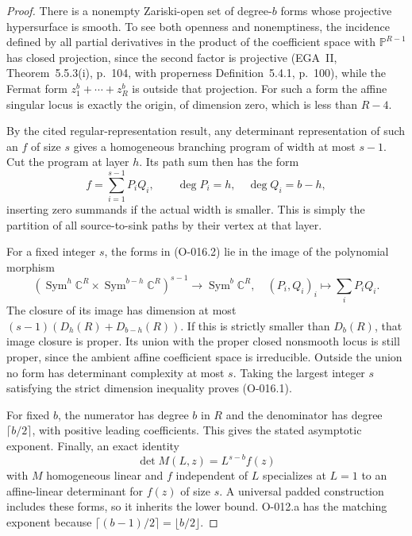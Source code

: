 \begin{proof}
There is a nonempty Zariski-open set of degree-$b$ forms
whose projective hypersurface is smooth. To see both openness
and nonemptiness, the incidence defined by all partial
derivatives in the product of the coefficient space with
$\mathbb P^{R-1}$ has closed projection, since the second
factor is projective (EGA~II, Theorem~5.5.3(i), p.~104,
with properness Definition~5.4.1, p.~100), while the Fermat form
$z_1^b+\cdots+z_R^b$ is outside that projection.
For such a form the affine singular locus is exactly the
origin, of dimension zero, which is less than $R-4$.

By the cited regular-representation result, any determinant
representation of such an $f$ of size $s$ gives a homogeneous
branching program of width at most $s-1$. Cut the program
at layer $h$. Its path sum then has the form
\[
                f=\sum_{i=1}^{s-1}P_iQ_i,
       \qquad \deg P_i=h,\quad\deg Q_i=b-h,             \tag{O-016.2}
\]
inserting zero summands if the actual width is smaller.
This is simply the partition of all source-to-sink paths by
their vertex at that layer.

For a fixed integer $s$, the forms in (O-016.2) lie in the
image of the polynomial morphism
\[
 \left(\operatorname{Sym}^h\mathbb C^R
             \times\operatorname{Sym}^{b-h}\mathbb C^R\right)^{s-1}
 \longrightarrow\operatorname{Sym}^b\mathbb C^R,
                   \quad (P_i,Q_i)_i\longmapsto\sum_iP_iQ_i.
\]
The closure of its image has dimension at most
$(s-1)(D_h(R)+D_{b-h}(R))$. If this is strictly smaller
than $D_b(R)$, that image closure is proper. Its union with
the proper closed nonsmooth locus is still proper, since
the ambient affine coefficient space is irreducible.
Outside the union no form has determinant complexity at most
$s$. Taking the largest integer $s$ satisfying the strict
dimension inequality proves (O-016.1).

For fixed $b$, the numerator has degree $b$ in $R$ and
the denominator has degree $\lceil b/2\rceil$, with
positive leading coefficients. This gives the stated
asymptotic exponent. Finally, an exact identity
\[
                    \det M(L,z)=L^{s-b}f(z)
\]
with $M$ homogeneous linear and $f$ independent of $L$
specializes at $L=1$ to an affine-linear determinant for
$f(z)$ of size $s$. A universal padded construction includes
these forms, so it inherits the lower bound. O-012.a has
the matching exponent because
$\lceil(b-1)/2\rceil=\lfloor b/2\rfloor$.
\end{proof}

